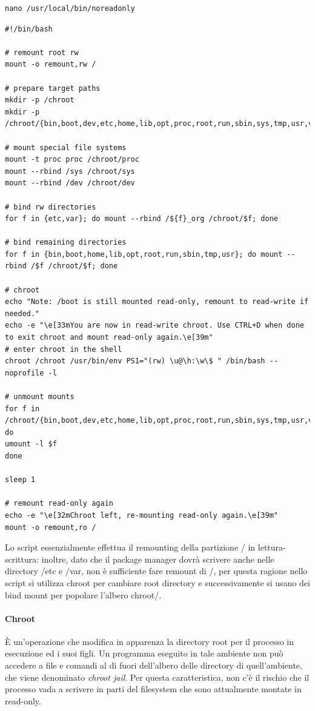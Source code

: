 \begin{lstlisting}
nano /usr/local/bin/noreadonly
\end{lstlisting}


\begin{lstlisting}
#!/bin/bash

# remount root rw
mount -o remount,rw /

# prepare target paths
mkdir -p /chroot
mkdir -p /chroot/{bin,boot,dev,etc,home,lib,opt,proc,root,run,sbin,sys,tmp,usr,var}

# mount special file systems
mount -t proc proc /chroot/proc
mount --rbind /sys /chroot/sys
mount --rbind /dev /chroot/dev

# bind rw directories
for f in {etc,var}; do mount --rbind /${f}_org /chroot/$f; done

# bind remaining directories
for f in {bin,boot,home,lib,opt,root,run,sbin,tmp,usr}; do mount --rbind /$f /chroot/$f; done

# chroot
echo "Note: /boot is still mounted read-only, remount to read-write if needed."
echo -e "\e[33mYou are now in read-write chroot. Use CTRL+D when done to exit chroot and mount read-only again.\e[39m"
# enter chroot in the shell
chroot /chroot /usr/bin/env PS1="(rw) \u@\h:\w\$ " /bin/bash --noprofile -l

# unmount mounts
for f in /chroot/{bin,boot,dev,etc,home,lib,opt,proc,root,run,sbin,sys,tmp,usr,var}; do
umount -l $f
done

sleep 1

# remount read-only again
echo -e "\e[32mChroot left, re-mounting read-only again.\e[39m"
mount -o remount,ro /

\end{lstlisting}

Lo script essenzialmente effettua il remounting della partizione / in lettura-scrittura: inoltre, dato che il package manager dovrà scrivere anche nelle directory /etc e /var, non è sufficiente fare remount di /, per questa ragione nello script si utilizza chroot per cambiare root directory e successivamente si usano dei bind mount per popolare l'albero chroot/.\\

\paragraph{Chroot}
È un'operazione che modifica in apparenza la directory root per il processo in esecuzione ed i suoi figli. Un programma eseguito in tale ambiente non può accedere a file e comandi al di fuori dell'albero delle directory di quell'ambiente, che viene denominato \textit{chroot jail}. Per questa caratteristica, non c'è il rischio che il processo vada a scrivere in parti del filesystem che sono attualmente montate in read-only.\\
